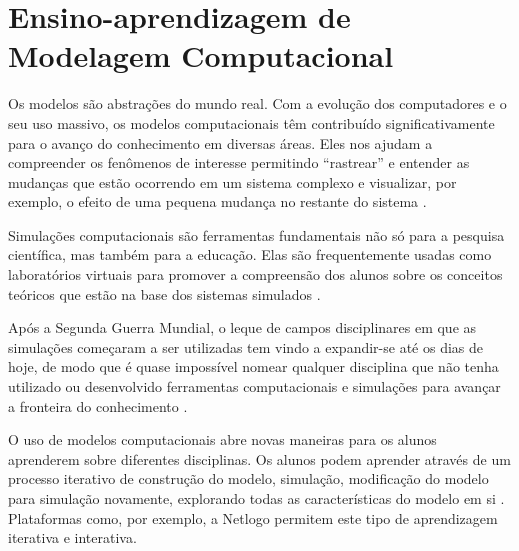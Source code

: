 \documentclass[
	12pt,				%
	openright,			%
	oneside,			%
	a4paper,			%
	main=brazil,
	english,			%
	]{ufsj-abntex2}
\begin{document}



\section{Ensino-aprendizagem de Modelagem Computacional}\label{sec:ensino-aprendizagem} 

Os modelos são abstrações do mundo real. Com a evolução dos computadores e o seu uso massivo, os modelos computacionais têm contribuído significativamente para o avanço do conhecimento em diversas áreas. Eles nos ajudam a compreender os fenômenos de interesse permitindo “rastrear” e entender as mudanças que estão ocorrendo em um sistema complexo e visualizar, por exemplo, o efeito de uma pequena mudança no restante do sistema \cite{Eleonora2022}. 

Simulações computacionais são ferramentas fundamentais não só para a pesquisa científica, mas também para a educação. Elas são frequentemente usadas como laboratórios virtuais para promover a compreensão dos alunos sobre os conceitos teóricos que estão na base dos sistemas simulados \cite{Eleonora2022}. 

Após a Segunda Guerra Mundial, o leque de campos disciplinares em que as simulações começaram a ser utilizadas tem vindo a expandir-se até os dias de hoje, de modo que é quase impossível nomear qualquer disciplina que não tenha utilizado ou desenvolvido ferramentas computacionais e simulações para avançar a fronteira do conhecimento \cite{Borrelli2019}.

O uso de modelos computacionais abre novas maneiras para os alunos aprenderem sobre diferentes disciplinas. Os alunos podem aprender através de um processo iterativo de construção do modelo, simulação, modificação do modelo para simulação novamente, explorando todas as características do modelo em si \cite{Eleonora2022}. Plataformas como, por exemplo, a Netlogo \cite{Netlogo2015} permitem este tipo de aprendizagem iterativa e interativa.
\end{document}
